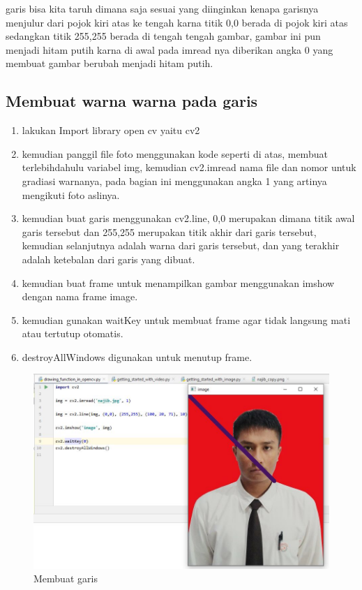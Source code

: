 garis bisa kita taruh dimana saja sesuai yang diinginkan kenapa garisnya menjulur dari pojok kiri atas ke tengah karna titik 0,0 berada di pojok kiri atas sedangkan titik 255,255 berada di tengah tengah gambar, gambar ini pun menjadi hitam putih karna di awal pada imread nya diberikan angka 0 yang membuat gambar berubah menjadi hitam putih.

\newpage
\subsection{Membuat warna warna pada garis}

\begin{enumerate}
	\item lakukan Import library open cv yaitu cv2
	\item kemudian panggil file foto menggunakan kode seperti di atas, membuat terlebihdahulu variabel img, kemudian cv2.imread nama file dan nomor untuk gradiasi warnanya, pada bagian ini menggunakan angka 1 yang artinya mengikuti foto aslinya.
	\item kemudian buat garis menggunakan cv2.line, 0,0 merupakan dimana titik awal garis tersebut dan 255,255 merupakan titik akhir dari garis tersebut, kemudian selanjutnya adalah warna dari garis tersebut, dan yang terakhir adalah ketebalan dari garis yang dibuat.
	\item kemudian buat frame untuk menampilkan gambar menggunakan imshow dengan nama frame image.
	\item kemudian gunakan waitKey untuk membuat frame agar tidak langsung mati atau tertutup otomatis.
	\item destroyAllWindows digunakan untuk menutup frame.
\end{enumerate}

\newpage
\begin{figure}[ht]
\centering
\includegraphics[scale=0.55]{figures/2,9.jpg}
\caption{Membuat garis}
\label{contoh}
\end{figure}

